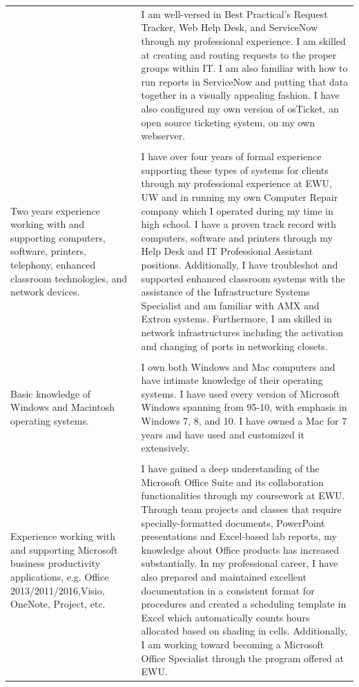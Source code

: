 \documentclass[a4paper,10pt]{article}
\begin{document}
\begin{longtable}{|p{.35\linewidth}|p{.6\linewidth}|}
	& I am well-versed in Best Practical's Request Tracker, Web Help Desk, and ServiceNow through my professional experience. I am skilled at creating and routing requests to the proper groups within IT. I am also familiar with how to run reports in ServiceNow and putting that data together in a visually appealing fashion. I have also configured my own version of osTicket, an open source ticketing system, on my own webserver. \\
	&\\
	Two years experience working with and supporting computers, software, printers, telephony, enhanced classroom technologies, and network devices.
	& I have over four years of formal experience supporting these types of systems for clients through my professional experience at EWU, UW and in running my own Computer Repair company which I operated during my time in high school. I have a proven track record with computers, software and printers through my Help Desk and IT Professional Assistant positions. Additionally, I have troubleshot and supported enhanced classroom systems with the assistance of the Infrastructure Systems Specialist and am familiar with AMX and Extron systems. Furthermore, I am skilled in network infrastructures including the activation and changing of ports in networking closets. \\
	&\\
	Basic knowledge of Windows and Macintosh operating systems.
	& I own both Windows and Mac computers and have intimate knowledge of their operating systems. I have used every version of Microsoft Windows spanning from 95-10, with emphasis in Windows 7, 8, and 10. I have owned a Mac for 7 years and have used and customized it extensively.\\
	&\\
	Experience working with and supporting Microsoft business productivity applications, e.g. Office 2013/2011/2016,Visio, OneNote, Project, etc.
	& I have gained a deep understanding of the Microsoft Office Suite and its collaboration functionalities through my coursework at EWU. Through team projects and classes that require specially-formatted documents, PowerPoint presentations and Excel-based lab reports, my knowledge about Office products has increased substantially. In my professional career, I have also prepared and maintained excellent documentation in a consistent format for procedures and created a scheduling template in Excel which automatically counts hours allocated based on shading in cells. Additionally, I am working toward becoming a Microsoft Office Specialist through the program offered at EWU.\\

\end{longtable}
\end{document}
